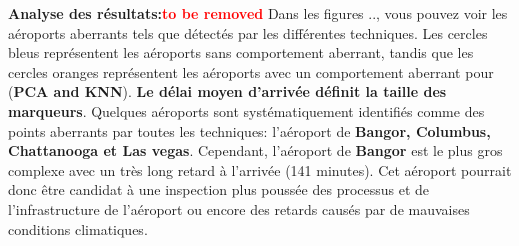 \noindent\textbf{Analyse des résultats:\textcolor{red}{to be removed}} 
Dans les figures .., vous pouvez voir les aéroports aberrants tels que détectés par les différentes techniques. Les cercles bleus représentent les aéroports sans comportement aberrant, tandis que les cercles oranges représentent les aéroports avec un comportement aberrant pour (\textbf{PCA and KNN}). \textbf{Le délai moyen d'arrivée définit la taille des marqueurs}. Quelques aéroports sont systématiquement identifiés comme des points aberrants par toutes les techniques: l’aéroport de \textbf{Bangor, Columbus, Chattanooga et Las vegas}. Cependant, l’aéroport de \textbf{Bangor} est le plus gros complexe avec un très long retard à l’arrivée (141 minutes). Cet aéroport pourrait donc être candidat à une inspection plus poussée des processus et de l’infrastructure de l’aéroport ou encore des retards causés par de mauvaises conditions climatiques.

